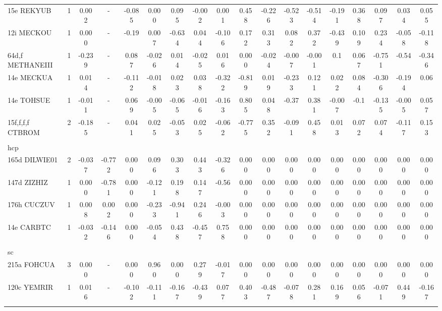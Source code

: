 \documentclass[preprint]{revtex4}
\begin{document}
\begin{table}[!ht]
\begin{tabular}{llcccccccccccccccc}
15e REKYUB & 1 & 0.002 & - & -0.085 & 0.000 & 0.095 & -0.002 & 0.001 & 0.458 & -0.226 & -0.523 & -0.514 & -0.191 & 0.368 & 0.097 & 0.034 & 0.055 \\
12i MECKOU & 1 & 0.000 & - & -0.19 & 0.007 & -0.634 & 0.044 & -0.106 & 0.172 & 0.313 & 0.082 & 0.372 & -0.439 & 0.109 & 0.234 & -0.058 & -0.118 \\
64d,f METHANEIII & 1 & -0.239 & - & 0.087 & -0.026 & 0.014 & -0.025 & 0.016 & 0.000 & -0.024 & -0.007 & -0.001 & 0.1 & 0.067 & -0.751 & -0.54 & -0.346 \\
14e MECKUA & 1 & 0.014 & - & -0.112 & -0.018 & 0.023 & 0.038 & -0.322 & -0.819 & 0.019 & -0.233 & 0.121 & 0.022 & 0.084 & -0.306 & -0.194 & 0.06 \\
14e TOHSUE & 1 & -0.011 & - & 0.069 & -0.005 & -0.065 & -0.016 & -0.163 & 0.805 & 0.048 & -0.37 & 0.381 & -0.007 & -0.1 & -0.135 & -0.005 & 0.057 \\
15f,f,f,f CTBROM & 2 & -0.185 & - & 0.041 & 0.025 & -0.053 & 0.025 & -0.062 & -0.775 & 0.352 & -0.091 & 0.458 & 0.013 & 0.072 & 0.074 & -0.117 & 0.153 \\
\\
hcp\\
165d DILWIE01 & 2 & -0.037 & -0.772 & 0.000  & 0.096 & 0.303 & 0.443 & -0.326 & 0.000  & 0.000  & 0.000  & 0.000  & 0.000  & 0.000  & 0.000  & 0.000 & 0.000 \\
147d ZIZHIZ & 1 & 0.000 & -0.781 & 0.000 & -0.121 & 0.198 & 0.147 & -0.56 & 0.000 & 0.000 & 0.000 & 0.000 & 0.000 & 0.000 & 0.000 & 0.000 & 0.000 \\
176h CUCZUV & 1 & 0.008 & 0.002 & 0.000  & -0.233 & -0.941 & 0.246 & -0.003 & 0.000  & 0.000  & 0.000  & 0.000  & 0.000  & 0.000  & 0.000  & 0.000  & 0.000  \\
14e CARBTC & 1 & -0.032 & -0.146 & 0.000 & -0.054 & 0.438 & -0.457 & 0.758 & 0.000 & 0.000 & 0.000 & 0.000 & 0.000 & 0.000 & 0.000 & 0.000 & 0.000 \\
\\
sc\\
215a FOHCUA & 3 & 0.000 & - & 0.000 & 0.960 & 0.000 & 0.279 & -0.017 & 0.000 & 0.000 & 0.000 & 0.000 & 0.000 & 0.000 & 0.000 & 0.000 & 0.000 \\
120c YEMRIR & 1 & 0.016 & - & -0.102 & -0.111 & -0.167 & -0.439 & 0.077 & 0.403 & -0.487 & -0.078 & 0.281 & 0.169 & 0.056 & -0.071 & 0.449 & -0.167\\
\hline\\
\end{tabular}
\end{table}
\end{document}
